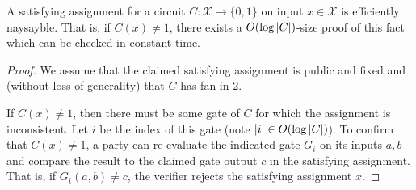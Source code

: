 \begin{lemma}\label{lemma:naysayingCSAT}
    A satisfying assignment for a circuit $C: \mathcal{X} \to \{0,1\}$ on input $x \in \mathcal{X}$ is efficiently naysayble. That is, if $C(x) \neq 1$, there exists a $O(\log{\lvert C \rvert})$-size proof of this fact which can be checked in constant-time.
\end{lemma}
\begin{proof}
    We assume that the claimed satisfying assignment is public and fixed and (without loss of generality) that $C$ has fan-in 2. 
    
    If $C(x) \neq 1$, then there must be some gate of $C$ for which the assignment is inconsistent. Let $i$ be the index of this gate (note $\lvert i \rvert \in O(\log{\lvert C \rvert})$). To confirm that $C(x) \neq 1$, a party can re-evaluate the indicated gate $G_i$ on its inputs $a,b$ and compare the result to the claimed gate output $c$ in the satisfying assignment. That is, if $G_i(a,b) \neq c$, the verifier rejects the satisfying assignment $x$.
\end{proof}

